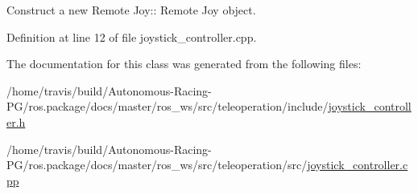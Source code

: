 Construct a new Remote Joy\+:\+: Remote Joy object. 



Definition at line 12 of file joystick\+\_\+controller.\+cpp.



The documentation for this class was generated from the following files\+:\begin{DoxyCompactItemize}
\item 
/home/travis/build/\+Autonomous-\/\+Racing-\/\+P\+G/ros.\+package/docs/master/ros\+\_\+ws/src/teleoperation/include/\hyperlink{joystick__controller_8h}{joystick\+\_\+controller.\+h}\item 
/home/travis/build/\+Autonomous-\/\+Racing-\/\+P\+G/ros.\+package/docs/master/ros\+\_\+ws/src/teleoperation/src/\hyperlink{joystick__controller_8cpp}{joystick\+\_\+controller.\+cpp}\end{DoxyCompactItemize}
